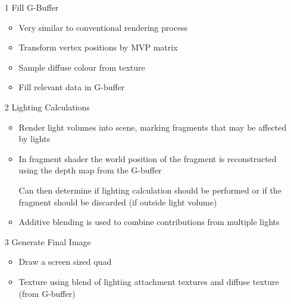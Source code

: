 \documentclass[a4paper]{article}
\begin{document}
\begin{enumerate}
  \item[1]
    Fill G-Buffer

    \begin{itemize}
      \item
        Very similar to conventional rendering process

      \item
        Transform vertex positions by MVP matrix

      \item
        Sample diffuse colour from texture

      \item
        Fill relevant data in G-buffer

    \end{itemize}

  \item[2]
    Lighting Calculations

    \begin{itemize}
      \item
        Render light volumes into scene, marking fragments that may be affected
        by lights

      \item
        In fragment shader the world position of the fragment is reconstructed
        using the depth map from the G-buffer

        Can then determine if lighting calculation should be performed or if the
        fragment should be discarded (if outside light volume)

      \item
        Additive blending is used to combine contributions from multiple lights

    \end{itemize}

  \item[3]
    Generate Final Image

    \begin{itemize}
      \item
        Draw a screen sized quad

      \item
        Texture using blend of lighting attachment textures and diffuse texture
        (from G-buffer)

    \end{itemize}

\end{enumerate}
\end{document}
